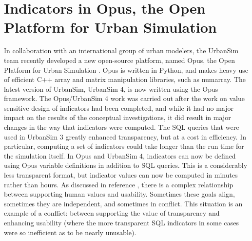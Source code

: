
\section{Indicators in Opus, the Open Platform for Urban Simulation}
\label{sec:opus}

In collaboration with an international group of urban modelers, the
UrbanSim team recently developed a new open-source platform, named Opus,
the Open Platform for Urban Simulation \cite{waddell-opus-2005}.  Opus is
written in Python, and makes heavy use of efficient C++ array and matrix
manipulation libraries, such as numarray.  The latest version of UrbanSim,
UrbanSim 4, is now written using the Opus framework.  The Opus/UrbanSim 4
work was carried out after the work on
value sensitive design of indicators had been completed, and while it had
no major impact on the results of the conceptual investigations, it did
result in major changes in the way that indicators were computed.  The SQL
queries that were used in UrbanSim 3 greatly enhanced transparency, but at
a cost in efficiency.  In particular, computing a set of indicators could
take longer than the run time for the simulation itself.  In Opus and
UrbanSim 4, indicators can now be defined using Opus variable definitions
in addition to SQL queries.  This is a considerably less transparent
format, but indicator values can now be computed in minutes rather than
hours.  As discussed in reference \cite{friedman-amis-2006}, there is a 
complex relationship between supporting human values and usability. 
Sometimes these goals align, sometimes they are independent, and sometimes
in conflict.  This situation is an example of a conflict: between supporting
the value of transparency and enhancing usability (where the more transparent
SQL indicators in some cases were so inefficient as to be nearly unusable).

